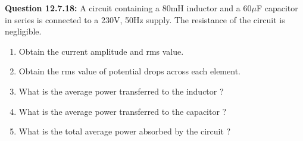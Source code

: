 \documentclass[a4,12pt,onecolumn]{IEEEtran}
\begin{document}
\textbf{Question 12.7.18:}
A circuit containing a 80mH inductor and a 60$\mu$F capacitor in series is connected to a 230V, 50Hz supply. The resistance of the circuit is negligible.\\
\begin{enumerate}
\item Obtain the current amplitude and rms value.
\item Obtain the rms value of potential drops across each element.
\item What is the average power transferred to the inductor ?
\item What is the average power transferred to the capacitor ?
\item What is the total average power absorbed by the circuit ? 
\end{enumerate}
\vspace{0.5mm}
\solution\\


\end{document}
